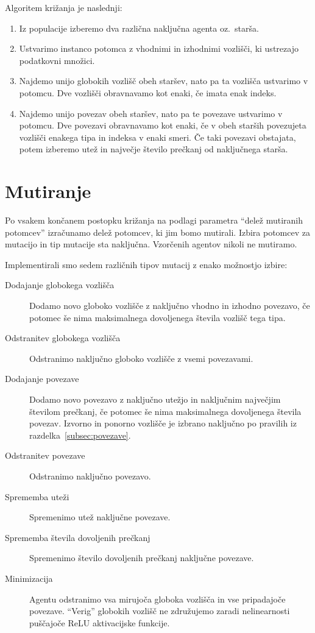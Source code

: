 \documentclass[a4paper,12pt,openright]{book}
\begin{document}
    Algoritem križanja je naslednji:
    \begin{enumerate}
        \item Iz populacije izberemo dva različna naključna agenta oz.\ starša.
        \item Ustvarimo instanco potomca z vhodnimi in izhodnimi vozlišči, ki ustrezajo podatkovni množici.
        \item Najdemo unijo globokih vozlišč obeh staršev, nato pa ta vozlišča ustvarimo v potomcu.
        Dve vozlišči obravnavamo kot enaki, če imata enak indeks.
        \item Najdemo unijo povezav obeh staršev, nato pa te povezave ustvarimo v potomcu.
        Dve povezavi obravnavamo kot enaki, če v obeh starših povezujeta vozlišči enakega tipa in indeksa v enaki smeri.
        Če taki povezavi obstajata, potem izberemo utež in največje število prečkanj od naključnega starša.
    \end{enumerate}


    \section{Mutiranje}\label{sec:mutiranje}
    Po vsakem končanem postopku križanja na podlagi parametra \enquote{delež mutiranih potomcev} izračunamo delež potomcev,
    ki jim bomo mutirali.
    Izbira potomcev za mutacijo in tip mutacije sta naključna. 
    Vzorčenih agentov nikoli ne mutiramo.

    Implementirali smo sedem različnih tipov mutacij z enako možnostjo izbire:
    \begin{description}
        \item[Dodajanje globokega vozlišča]{Dodamo novo globoko vozlišče z na\-klju\-čno vhodno in izhodno povezavo, če
        potomec še nima maksimalnega dovoljenega števila vozlišč tega tipa.}
        \item[Odstranitev globokega vozlišča]{Odstranimo naključno globoko vozlišče z vsemi povezavami.}
        \item[Dodajanje povezave]{Dodamo novo povezavo z naključno utežjo in naključnim največjim
        številom prečkanj, če potomec še nima maksimalnega dovoljenega števila povezav. Izvorno in ponorno vozlišče je
        izbrano naključno po pravilih iz razdelka~\ref{subsec:povezave}. }
        \item[Odstranitev povezave]{Odstranimo naključno povezavo.}
        \item[Sprememba uteži]{Spremenimo utež naključne povezave.}
        \item[Sprememba števila dovoljenih prečkanj]{Spremenimo šte\-vi\-lo dovoljenih prečkanj naključne povezave.}
        \item[Minimizacija]{Agentu odstranimo vsa mirujoča globoka vozlišča in vse pripadajoče povezave. \enquote{Verig} globokih
        vozlišč ne združujemo zaradi nelinearnosti puščajoče ReLU aktivacijske funkcije.}
    \end{description}
\end{document}
